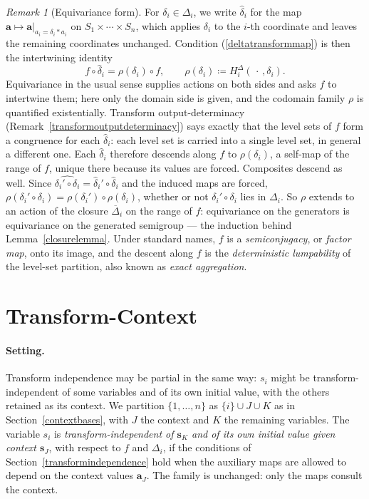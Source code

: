 \documentclass{article}
\theoremstyle{definition}
\theoremstyle{remark}
\newtheorem{remark}[proposition]{Remark}
\begin{document}
\begin{remark}[Equivariance form]
\label{equivarianceform}
For $\delta_i \in \Delta_i$, we write $\hat{\delta}_i$ for the map $\boldsymbol{a} \mapsto \boldsymbol{a}|_{a_i = \delta_i \ast a_i}$ on $S_1 \times \cdots \times S_n$, which applies $\delta_i$ to the $i$-th coordinate and leaves the remaining coordinates unchanged. Condition (\ref{deltatransformmap}) is then the intertwining identity
\[
f \circ \hat{\delta}_i = \rho(\delta_i) \circ f, \qquad \rho(\delta_i) \coloneqq H_i^\Delta(\,\cdot\,, \delta_i).
\]
Equivariance in the usual sense supplies actions on both sides and asks $f$ to intertwine them; here only the domain side is given, and the codomain family $\rho$ is quantified existentially. Transform output-determinacy (Remark~\ref{transformoutputdeterminacy}) says exactly that the level sets of $f$ form a congruence for each $\hat{\delta}_i$: each level set is carried into a single level set, in general a different one. Each $\hat{\delta}_i$ therefore descends along $f$ to $\rho(\delta_i)$, a self-map of the range of $f$, unique there because its values are forced. Composites descend as well. Since $\widehat{\delta_i' \circ \delta_i} = \hat{\delta}_i' \circ \hat{\delta}_i$ and the induced maps are forced, $\rho(\delta_i' \circ \delta_i) = \rho(\delta_i') \circ \rho(\delta_i)$, whether or not $\delta_i' \circ \delta_i$ lies in $\Delta_i$. So $\rho$ extends to an action of the closure $\overline{\Delta}_i$ on the range of $f$: equivariance on the generators is equivariance on the generated semigroup --- the induction behind Lemma~\ref{closurelemma}. Under standard names, $f$ is a \textit{semiconjugacy}, or \textit{factor map}, onto its image, and the descent along $f$ is the \textit{deterministic lumpability} of the level-set partition, also known as \textit{exact aggregation}.
\end{remark}

\newpage

\section{Transform-Context}
\label{transformcontext}
\paragraph{Setting.} Transform independence may be partial in the same way: $s_i$ might be transform-independent of some variables and of its own initial value, with the others retained as its context. We partition $\{1, \ldots, n\}$ as $\{i\} \cup J \cup K$ as in Section~\ref{contextbases}, with $J$ the context and $K$ the remaining variables. The variable $s_i$ is \textit{transform-independent of $\boldsymbol{s}_K$ and of its own initial value given context $\boldsymbol{s}_J$}, with respect to $f$ and $\Delta_i$, if the conditions of Section~\ref{transformindependence} hold when the auxiliary maps are allowed to depend on the context values $\boldsymbol{a}_J$. The family is unchanged: only the maps consult the context.
\end{document}
